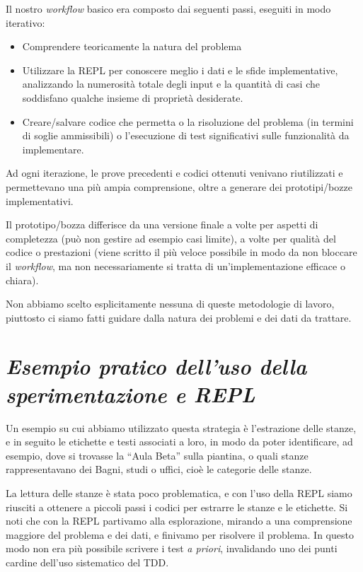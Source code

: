 \documentclass[12pt]{report}
\begin{document}
Il nostro \textit{workflow} basico era composto dai seguenti passi, eseguiti in modo iterativo:

\begin{itemize}
	\item Comprendere teoricamente la natura del problema
	\item Utilizzare la REPL per conoscere meglio i dati e le sfide implementative, analizzando la numerosità totale degli input e la quantità di casi che soddisfano  qualche insieme di proprietà desiderate.
	\item Creare/salvare codice che permetta o la risoluzione del problema (in termini di soglie ammissibili) o l'esecuzione di test significativi sulle funzionalità da implementare.
\end{itemize}

Ad ogni iterazione, le prove precedenti e codici ottenuti venivano riutilizzati e permettevano una più ampia comprensione, oltre a generare dei prototipi/bozze implementativi.

Il prototipo/bozza differisce da una versione finale a volte per aspetti di completezza (può non gestire ad esempio casi limite), a volte per qualità del codice o prestazioni (viene scritto il più veloce possibile in modo da non bloccare il \textit{workflow}, ma non necessariamente si tratta di un'implementazione efficace o chiara).

Non abbiamo scelto esplicitamente nessuna di queste metodologie di lavoro, piuttosto ci siamo fatti guidare dalla natura dei problemi e dei dati da trattare. 

\section{\textit{Esempio pratico dell'uso della sperimentazione e REPL}}

Un esempio su cui abbiamo utilizzato questa strategia è l'estrazione delle stanze, e in seguito le etichette e testi associati a loro, in modo da poter identificare, ad esempio, dove si trovasse la ``Aula Beta'' sulla piantina, o quali stanze rappresentavano dei Bagni, studi o uffici, cioè le categorie delle stanze.

La lettura delle stanze è stata poco problematica, e con l'uso della REPL siamo riusciti a ottenere a piccoli passi i codici per estrarre le stanze e le etichette. Si noti che con la REPL partivamo alla esplorazione, mirando a una comprensione maggiore del problema e dei dati, e finivamo per risolvere il problema. In questo modo non era più possibile scrivere i test \textit{a priori}, invalidando uno dei punti cardine dell'uso sistematico del TDD.
\end{document}
